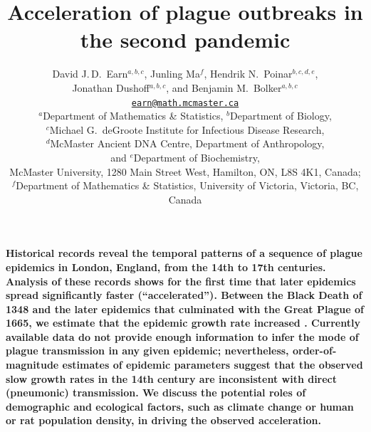 \title{Acceleration of plague outbreaks in the second pandemic}

\author{David J.\,D.\ Earn$^{a,b,c}$, 
Junling Ma$^{f}$, 
Hendrik N.\ Poinar$^{b,c,d,e}$,\\
Jonathan Dushoff$^{a,b,c}$,
and Benjamin M.\ Bolker$^{a,b,c}$\\
\href{mailto:earn@math.mcmaster.ca}{\tt earn@math.mcmaster.ca}\\
\small $^a$Department of Mathematics \& Statistics, $^b$Department of Biology, \\
\small $^c$Michael G.\ deGroote Institute for Infectious Disease Research,\\
\small $^d$McMaster Ancient DNA Centre, Department of Anthropology,\\
\small and $^e$Department of Biochemistry,\\
\small McMaster University, 1280 Main Street West, Hamilton, ON, L8S 4K1, Canada;\\
\small $^f$Department of Mathematics \& Statistics, University of Victoria, Victoria, BC, Canada}



\linenumbers

\maketitle

{\bfseries
\noindent
Historical records reveal the temporal patterns of a sequence of plague epidemics in London, England, from the 14th to 17th centuries.  Analysis of these records shows for the first time that later epidemics spread significantly faster (``accelerated'').  Between the Black Death of 1348 and the later epidemics that culminated with the Great Plague of 1665, we estimate that the epidemic growth rate increased \foldval.
Currently available data do not provide enough information to infer the mode of plague transmission in any given epidemic; nevertheless, order-of-magnitude estimates of epidemic parameters suggest that the observed slow growth rates in the 14th century are inconsistent with direct (pneumonic) transmission.  
We discuss the potential roles of demographic and ecological factors, such as climate change or human or rat population density, in driving the observed acceleration.
}  

